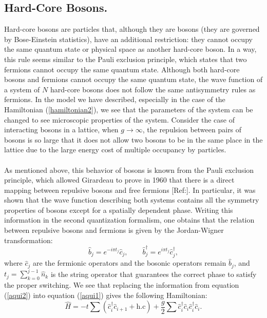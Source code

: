 \subsection{Hard-Core Bosons.}
Hard-core bosons are particles that, although they are bosons (they are governed by Bose-Einstein statistics), have an additional restriction: they cannot occupy the same quantum state or physical space as another hard-core boson. In a way, this rule seems similar to the Pauli exclusion principle, which states that two fermions cannot occupy the same quantum state. Although both hard-core bosons and fermions cannot occupy the same quantum state, the wave function of a system of $N$ hard-core bosons does not follow the same antisymmetry rules as fermions. In the model we have described, especially in the case of the Hamiltonian (\ref{hamiltonian2}), we see that the parameters of the system can be changed to see microscopic properties of the system. Consider the case of interacting bosons in a lattice, when $g \rightarrow \infty$, the repulsion between pairs of bosons is so large that it does not allow two bosons to be in the same place in the lattice due to the large energy cost of multiple occupancy by particles.\\ \\
As mentioned above, this behavior of bosons is known from the Pauli exclusion principle, which allowed Girardeau to prove in 1960 that there is a direct mapping between repulsive bosons and free fermions [Ref:]. In particular, it was shown that the wave function describing both systems contains all the symmetry properties of bosons except for a spatially dependent phase. Writing this information in the second quantization formalism, one obtains that the relation between repulsive bosons and fermions is given by the Jordan-Wigner transformation:
\begin{equation} \label{aqui2}
    \hat{b}_{j} = e^{-i\pi t_{j}} \hat{c}_{j}, \quad \quad     \hat{b}^{\dagger}_{j} = e^{i\pi t_{j}} \hat{c}^{\dagger}_{j}, 
\end{equation}
where $\hat{c}_{j}$ are the fermionic operators and the bosonic operators remain $\hat{b}_{j}$, and $t_{j} = \sum_{k=0}^{j-1} \hat{n}_{k}$ is the string operator that guarantees the correct phase to satisfy the proper switching. We see that replacing the information from equation (\ref{aqui2}) into equation (\ref{aqui1}) gives the following Hamiltonian:
\begin{equation}
    \hat{H} = -t \sum \left( \hat{c}_{i}^{\dagger}\hat{c}_{i+1}^{} + \text{h.c}
 \right)  +\frac{g}{2} \sum \hat{c}_{i}^{\dagger}\hat{c}_{i}^{}\hat{c}_{i}^{\dagger}\hat{c}_{i}^{}.
\end{equation}
